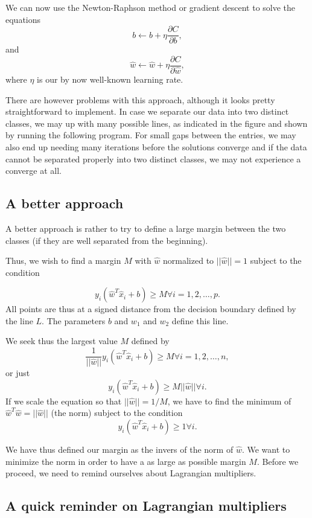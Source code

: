 \documentclass[%
oneside,                 %
final,                   %
10pt]{article}
\begin{document}
We can now use the Newton-Raphson method or gradient descent to solve the equations
\[
b \leftarrow b +\eta \frac{\partial C}{\partial b},
\]
and
\[
\hat{w} \leftarrow \hat{w} +\eta \frac{\partial C}{\partial \hat{w}},
\]
where $\eta$ is our by now well-known learning rate. 

There are however problems with this approach, although it looks
pretty straightforward to implement. In case we separate our data into
two distinct classes, we may up with many possible lines, as indicated
in the figure and shown by running the following program. For small
gaps between the entries, we may also end up needing many iterations
before the solutions converge and if the data cannot be separated
properly into two distinct classes, we may not experience a converge
at all.

\subsection{A better approach}

A better approach is rather to try to define a large margin between
the two classes (if they are well separated from the beginning).

Thus, we wish to find a margin $M$ with $\hat{w}$ normalized to
$\vert\vert \hat{w}\vert\vert =1$ subject to the condition

\[
y_i(\hat{w}^T\hat{x}_i+b) \geq M \forall i=1,2,\dots, p. 
\]
All points are thus at a signed distance from the decision boundary defined by the line $L$. The parameters $b$ and $w_1$ and $w_2$ define this line. 

We seek thus the largest value $M$ defined by
\[
\frac{1}{\vert \vert \hat{w}\vert\vert}y_i(\hat{w}^T\hat{x}_i+b) \geq M \forall i=1,2,\dots, n, 
\]
or just 
\[
y_i(\hat{w}^T\hat{x}_i+b) \geq M\vert \vert \hat{w}\vert\vert \forall i. 
\]
If we scale the equation so that $\vert \vert \hat{w}\vert\vert = 1/M$, we have to find the minimum of 
$\hat{w}^T\hat{w}=\vert \vert \hat{w}\vert\vert$ (the norm) subject to the condition
\[
y_i(\hat{w}^T\hat{x}_i+b) \geq 1 \forall i.
\]

We have thus defined our margin as the invers of the norm of $\hat{w}$. We want to minimize the norm in order to have a as large as possible margin $M$. Before we proceed, we need to remind ourselves about Lagrangian multipliers. 

\subsection{A quick reminder on Lagrangian multipliers}
\end{document}
